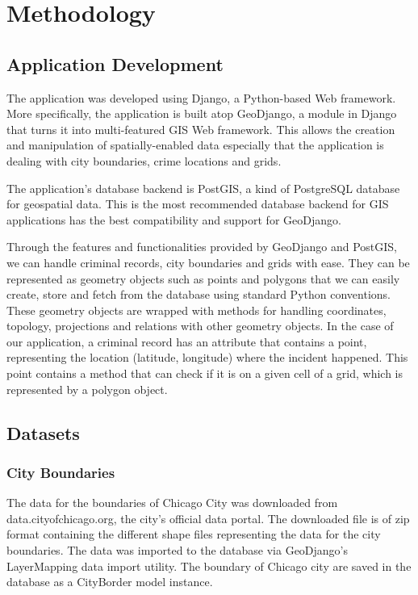 
\chapter{Methodology}  %


\section{Application Development}
    The application was developed using Django, a Python-based Web framework. More specifically, the application is built atop GeoDjango, a module in Django that turns it into multi-featured GIS Web framework. This allows the creation and manipulation of spatially-enabled data especially that the application is dealing with city boundaries, crime locations and grids.

    The application's database backend is PostGIS, a kind of PostgreSQL database for geospatial data. This is the most recommended database backend for GIS applications has the best compatibility and support for GeoDjango.

    Through the features and functionalities provided by GeoDjango and PostGIS, we can handle criminal records, city boundaries and grids with ease. They can be represented as geometry objects such as points and polygons that we can easily create, store and fetch from the database using standard Python conventions. These geometry objects are wrapped with methods for handling coordinates, topology, projections and relations with other geometry objects. In the case of our application, a criminal record has an attribute that contains a point, representing the location (latitude, longitude) where the incident happened. This point contains a method that can check if it is on a given cell of a grid, which is represented by a polygon object.

\section{Datasets}
    \subsection{City Boundaries}
        The data for the boundaries of Chicago City was downloaded from data.cityofchicago.org, the city's official data portal. The downloaded file is of zip format containing the different shape files representing the data for the city boundaries. The data was imported to the database via GeoDjango's LayerMapping data import utility. The boundary of Chicago city are saved in the database as a CityBorder model instance.

